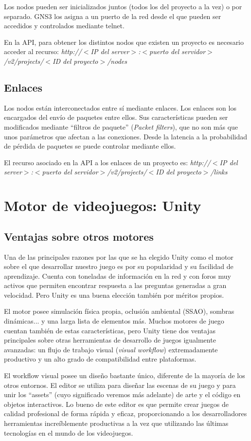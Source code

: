 Los nodos pueden ser inicializados juntos (todos los del proyecto a la vez) o por separado. GNS3 los asigna a un puerto de la red desde el que pueden ser accedidos y controlados mediante telnet.

En la API, para obtener los distintos nodos que existen un proyecto es necesario acceder al recurso: \textit{http://$<$IP del server$>$:$<$puerto del servidor$>$/v2/projects/$<$ID del proyecto$>$/nodes}

\subsection{Enlaces}
Los nodos están interconectados entre sí mediante enlaces. Los enlaces son los encargados del envío de paquetes entre ellos. Sus características pueden ser modificados mediante ``filtros de paquete'' (\textit{Packet filters}), que no son más que unos parámetros que afectan a las conexiones. Desde la latencia a la probabilidad de pérdida de paquetes se puede controlar mediante ellos.

El recurso asociado en la API a los enlaces de un proyecto es: \textit{http://$<$IP del server$>$:$<$puerto del servidor$>$/v2/projects/$<$ID del proyecto$>$/links}
 
\section{Motor de videojuegos: Unity}
\subsection{Ventajas sobre otros motores}
Una de las principales razones por las que se ha elegido Unity como el motor sobre el que desarrollar nuestro juego es por su popularidad y su facilidad de aprendizaje. Cuenta con toneladas de información en la red y con foros muy activos que permiten encontrar respuesta a las preguntas generadas a gran velocidad. Pero Unity es una buena elección también por méritos propios.

El motor posee simulación física propia, oclusión ambiental (SSAO), sombras dinámicas... y una larga lista de elementos más. Muchos motores de juego cuentan también de estas características, pero Unity tiene dos ventajas principales sobre otras herramientas de desarrollo de juegos igualmente avanzadas: un flujo de trabajo visual (\textit{visual workflow}) extremadamente productivo y un alto grado de compatibilidad entre plataformas.

El workflow visual posee un diseño bastante único, diferente de la mayoría de los otros entornos. El editor se utiliza para diseñar las escenas de su juego y para unir los ``assets'' (cuyo significado veremos más adelante) de arte y el código en objetos interactivos. Lo bueno de este editor es que permite crear juegos de calidad profesional de forma rápida y eficaz, proporcionando a los desarrolladores herramientas increíblemente productivas a la vez que utilizando las últimas tecnologías en el mundo de los videojuegos.

